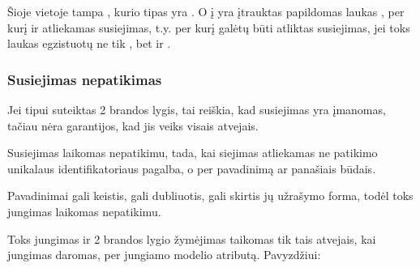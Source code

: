 \documentclass[letterpaper,10pt,lithuanian]{sphinxmanual}
\begin{document}
\sphinxAtStartPar
Šioje vietoje  tampa , kurio tipas yra . O į
 yra įtrauktas papildomas laukas , per kurį ir atliekamas
susiejimas, t.y. per kurį galėtų būti atliktas susiejimas, jei toks laukas
egzistuotų ne tik , bet ir .


\subsubsection{Susiejimas nepatikimas}
\label{\detokenize{identifikatoriai:susiejimas-nepatikimas}}
\sphinxAtStartPar
Jei  tipui suteiktas 2 brandos lygis, tai reiškia, kad susiejimas yra
įmanomas, tačiau nėra garantijos, kad jis veiks visais atvejais.

\sphinxAtStartPar
Susiejimas laikomas nepatikimu, tada, kai siejimas atliekamas ne patikimo
unikalaus identifikatoriaus pagalba, o per pavadinimą ar panašiais būdais.

\sphinxAtStartPar
Pavadinimai gali keistis, gali dubliuotis, gali skirtis jų užrašymo forma, todėl
toks jungimas laikomas nepatikimu.

\sphinxAtStartPar
Toks jungimas ir 2 brandos lygio žymėjimas taikomas tik tais atvejais, kai
jungimas daromas, per jungiamo modelio atributą. Pavyzdžiui:
\end{document}
